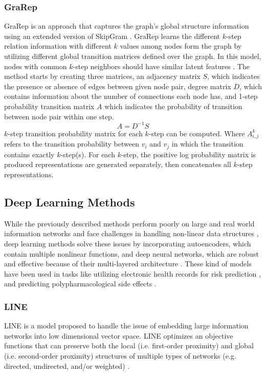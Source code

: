\subsubsection{GraRep}
\ac{GraRep} is an approach that captures the graph’s global structure information using an extended version of SkipGram \cite{cao_grarep:_2015}. \ac{GraRep} learns the different $k$-step relation information with different $k$ values among nodes form the graph by utilizing different global transition matrices defined over the graph. In this model, nodes with common $k$-step neighbors should have similar latent features \cite{cao_grarep:_2015}.
The method starts by creating three matrices, an adjacency matrix $S$, which indicates the presence or absence of edges between given node pair, degree matrix $D$, which contains information about the number of connections each node has, and 1-step probability transition matrix $A$ which indicates the probability of transition between node pair within one step.
\begin{equation} \label{eq:grarep_01}
A = D^{-1}S
\end{equation}
$k$-step transition probability matrix for each $k$-step can be computed. Where $A^{k}_{i,j}$ refers to the transition probability between $v_{i}$ and $v_{j}$ in which the transition contains exactly $k$-step(s). For each $k$-step, the positive log probability matrix is produced representations are generated separately, then concatenates all $k$-step representations.

\subsection{Deep Learning Methods}
While the previously described methods perform poorly on large and real world information networks and face challenges in handling non-linear data structures \cite{cui_survey_2017}, deep learning methods solve these issues by incorporating autoencoders, which contain multiple nonlinear functions,  and deep neural networks, which are robust and effective because of their multi-layered architecture \cite{cai_comprehensive_2017}. These kind of models have been used in tasks like utilizing electronic health records for risk prediction \cite{cheng_risk_2016}, and predicting polypharmacological side effects \cite{zitnik_modeling_2018}.

\subsubsection{LINE}
\ac{LINE} is a model proposed to handle the issue of embedding large information networks into low dimensional vector space. \ac{LINE} optimizes an objective functions that can preserve both the local (i.e. first-order proximity) and global (i.e. second-order proximity) structures of multiple types of networks (e.g. directed, undirected, and/or weighted) \cite{tang_line:_2015}.


